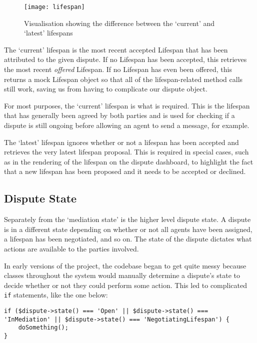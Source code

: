 \begin{figure}[h!]
  \centering
    \ifimages
    \texttt{[image: lifespan]}
    \fi
  \caption{Visualisation showing the difference between the `current' and `latest' lifespans}
  \label{uml:lifespan}
\end{figure}

The `current' lifespan is the most recent accepted Lifespan that has been attributed to the given dispute. If no Lifespan has been accepted, this retrieves the most recent \emph{offered} Lifespan. If no Lifespan has even been offered, this returns a mock Lifespan object so that all of the lifespan-related method calls still work, saving us from having to complicate our dispute object.

For most purposes, the `current' lifespan is what is required. This is the lifespan that has generally been agreed by both parties and is used for checking if a dispute is still ongoing before allowing an agent to send a message, for example.

The `latest' lifespan ignores whether or not a lifespan has been accepted and retrieves the very latest lifespan proposal. This is required in special cases, such as in the rendering of the lifespan on the dispute dashboard, to highlight the fact that a new lifespan has been proposed and it needs to be accepted or declined.

\subsection{Dispute State}

Separately from the `mediation state' is the higher level dispute state. A dispute is in a different state depending on whether or not all agents have been assigned, a lifespan has been negotiated, and so on. The state of the dispute dictates what actions are available to the parties involved.

In early versions of the project, the codebase began to get quite messy because classes throughout the system would manually determine a dispute's state to decide whether or not they could perform some action. This led to complicated \lstinline{if} statements, like the one below:

\begin{lstlisting}
if ($dispute->state() === 'Open' || $dispute->state() === 'InMediation' || $dispute->state() === 'NegotiatingLifespan') {
    doSomething();
}
\end{lstlisting}

